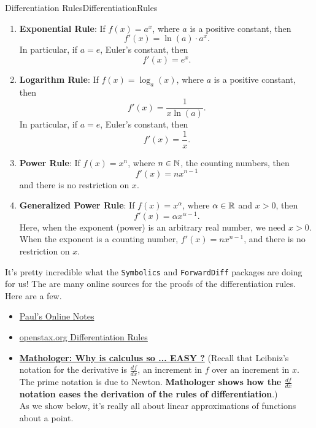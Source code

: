 \begin{propColor}{Differentiation Rules}{DifferentiationRules}
\begin{enumerate}
    \item \textbf{Exponential Rule}: 
    If $f(x) = a^x$, where $a$ is a positive constant, then
   $$f'(x) = \ln(a) \cdot a^x .$$
   In particular, if  $a=e$, Euler's constant, then
     $$f'(x) = e^x. $$

    \item \textbf{Logarithm Rule}: 
    If $f(x) = \log_a(x) $, where $a$ is a positive constant, then
   $$f'(x) = \frac{1}{x \ln(a)}. $$
   In particular, if  $a=e$, Euler's constant, then
     $$f'(x) = \frac{1}{x}. $$

            \item \textbf{Power Rule}: 
    If $f(x) = x^n$, where $n \in \mathbb N$, the counting numbers, then
   $$f'(x) = n x^{n-1}$$
   and there is no restriction on $x$.   


     \item \textbf{Generalized Power Rule}: 
    If $f(x) = x^\alpha$, where $\alpha \in \mathbb R$ and $x>0$, then
   $$f'(x) = \alpha x^{\alpha - 1}.$$
   Here, when the exponent (power) is an arbitrary real number, we need $x>0$. When the exponent is a counting number, $f'(x) = n x^{n-1}$, and there is no restriction on $x$.


\end{enumerate} 

It's pretty incredible what the \texttt{Symbolics} and \texttt{ForwardDiff} packages are doing for us! The are many online sources for the proofs of the differentiation rules. Here are a few.
\begin{itemize}
    \item \href{https://tutorial.math.lamar.edu/classes/calci/DerivativeProofs.aspx}{Paul's Online Notes}
    \item \href{https://openstax.org/books/calculus-volume-1/pages/3-3-differentiation-rules}{openstax.org Differentiation Rules}
    \item \href{https://youtu.be/kuOxDh3egN0?t=1669}{\bf Mathologer: Why is calculus so ... EASY ?} (Recall that Leibniz's notation for the derivative is $\frac{df}{dx}$, an increment in $f$ over an increment in $x$. The prime notation is due to Newton. {\bf Mathologer shows how the $\frac{df}{dx}$ notation eases the derivation of the rules of differentiation}.) \\
    
    As we show below, it's really all about linear approximations of functions about a point.
\end{itemize}

\end{propColor}

